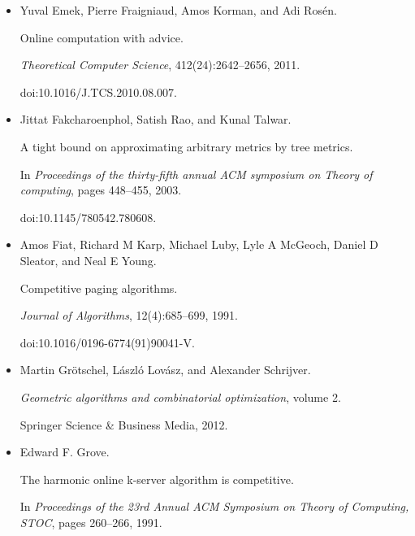 \begin{itemize}
doi:10.4230/LIPIcs.ICALP.2017.126.





\item[] 
[21]

Yuval Emek, Pierre Fraigniaud, Amos Korman, and Adi Rosén.


Online computation with advice.


\emph{Theoretical Computer Science}, 412(24):2642–2656, 2011.


doi:10.1016/J.TCS.2010.08.007.





\item[] 
[22]

Jittat Fakcharoenphol, Satish Rao, and Kunal Talwar.


A tight bound on approximating arbitrary metrics by tree metrics.


In \emph{Proceedings of the thirty-fifth annual ACM symposium on
Theory of computing}, pages 448–455, 2003.


doi:10.1145/780542.780608.





\item[] 
[23]

Amos Fiat, Richard M Karp, Michael Luby, Lyle A McGeoch, Daniel D Sleator, and
Neal E Young.


Competitive paging algorithms.


\emph{Journal of Algorithms}, 12(4):685–699, 1991.


doi:10.1016/0196-6774(91)90041-V.





\item[] 
[24]

Martin Grötschel, László Lovász, and Alexander Schrijver.


\emph{Geometric algorithms and combinatorial optimization}, volume 2.


Springer Science \& Business Media, 2012.





\item[] 
[25]

Edward F. Grove.


The harmonic online k-server algorithm is competitive.


In \emph{Proceedings of the 23rd Annual ACM Symposium on Theory of
Computing, STOC}, pages 260–266, 1991.



\end{itemize}
